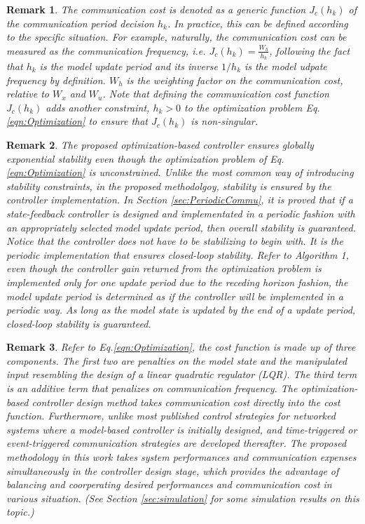 \documentclass[letterpaper, 10 pt, conference]{ieeeconf}\IEEEoverridecommandlockouts%
\newtheorem{remark}{Remark}
\begin{document}
\begin{remark}\label{rk:CostFunc}
  The communication cost is denoted as a generic function $J_c(h_k)$ of the communication period decision $h_k$. In practice, this can be defined according to the specific situation. For example, naturally, the communication cost can be measured as the communication frequency, i.e. $J_c(h_k) = \displaystyle{\frac{W_h}{h_k}}$, following the fact that $h_k$ is the model update period and its inverse $1/h_k$ is the model udpate frequency by definition. $W_h$ is the weighting factor on the communication cost, relative to $W_x$ and $W_u$. Note that defining the communication cost function $J_c(h_k)$ adds another constraint, $h_k > 0$ to the optimization problem Eq.\ref{eqn:Optimization} to ensure that $J_c(h_k)$ is non-singular. 
\end{remark}

\begin{remark}
  The proposed optimization-based controller ensures globally exponential stability even though the optimization problem of Eq.\ref{eqn:Optimization} is unconstrained. Unlike the most common way of introducing stability constraints, in the proposed methodolgoy, stability is ensured by the controller implementation. In Section \ref{sec:PeriodicCommu}, it is proved that if a state-feedback controller is designed and implementated in a periodic fashion with an appropriately selected model update period, then overall stability is guaranteed. Notice that the controller does not have to be stabilizing to begin with. It is the periodic implementation that ensures closed-loop stability. Refer to Algorithm 1, even though the controller gain returned from the optimization problem is implemented only for one update period due to the receding horizon fashion, the model update period is determined as if the controller will be implemented in a periodic way. As long as the model state is updated by the end of a update period, closed-loop stability is guaranteed.
\end{remark}

\begin{remark}
  Refer to Eq.\ref{eqn:Optimization}, the cost function is made up of three components. The first two are penalties on the model state and the manipulated input resembling the design of a linear quadratic regulator (LQR). The third term is an additive term that penalizes on communication frequency. The optimization-based controller design method takes communication cost directly into the cost function. Furthermore, unlike most published control strategies for networked systems where a model-based controller is initially designed, and time-triggered or event-triggered communication strategies are developed thereafter. The proposed methodology in this work takes system performances and communication expenses simultaneously in the controller design stage, which provides the advantage of balancing and coorperating desired performances and communication cost in various situation. (See Section \ref{sec:simulation} for some simulation results on this topic.)
\end{remark}
\end{document}
